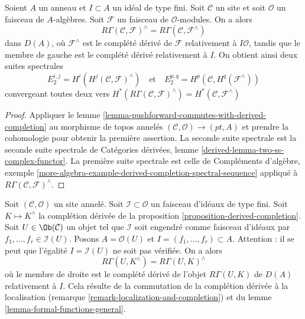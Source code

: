 \begin{lemma}
\label{lemma-formal-functions-general}
Soient $A$ un anneau et $I \subset A$ un idéal de type fini.
Soit $\mathcal{C}$ un site et soit $\mathcal{O}$ un faisceau
de $A$-algèbres. Soit $\mathcal{F}$ un faisceau de $\mathcal{O}$-modules.
On a alors
$$
R\Gamma(\mathcal{C}, \mathcal{F})^\wedge =
R\Gamma(\mathcal{C}, \mathcal{F}^\wedge)
$$
dans $D(A)$, où $\mathcal{F}^\wedge$ est le complété
dérivé de $\mathcal{F}$ relativement à $I\mathcal{O}$, tandis que le membre de
gauche est le complété dérivé relativement à $I$.
On obtient ainsi deux suites spectrales
$$
E_2^{i, j} = H^i(H^j(\mathcal{C}, \mathcal{F})^\wedge)
\quad\text{et}\quad
E_2^{p, q} = H^p(\mathcal{C}, H^q(\mathcal{F}^\wedge))
$$
convergeant toutes deux vers
$H^*(R\Gamma(\mathcal{C}, \mathcal{F})^\wedge) =
H^*(\mathcal{C}, \mathcal{F}^\wedge)$
\end{lemma}

\begin{proof}
Appliquer le lemme \ref{lemma-pushforward-commutes-with-derived-completion}
au morphisme de topos annelés $(\mathcal{C}, \mathcal{O}) \to (pt, A)$
et prendre la cohomologie pour obtenir la première assertion. La seconde suite spectrale
est la seconde suite spectrale de
Catégories dérivées, lemme \ref{derived-lemma-two-ss-complex-functor}.
La première suite spectrale est celle de
Compléments d'algèbre, exemple
\ref{more-algebra-example-derived-completion-spectral-sequence}
appliqué à $R\Gamma(\mathcal{C}, \mathcal{F})^\wedge$.
\end{proof}

\begin{remark}
\label{remark-local-calculation-derived-completion}
Soit $(\mathcal{C}, \mathcal{O})$ un site annelé.
Soit $\mathcal{I} \subset \mathcal{O}$ un faisceau d'idéaux
de type fini. Soit $K \mapsto K^\wedge$ la complétion dérivée de la
proposition \ref{proposition-derived-completion}.
Soit $U \in \Ob(\mathcal{C})$ un objet tel que $\mathcal{I}$
soit engendré comme faisceau d'idéaux par $f_1, \ldots, f_r \in \mathcal{I}(U)$.
Posons $A = \mathcal{O}(U)$ et $I = (f_1, \ldots, f_r) \subset A$.
Attention : il se peut que l'égalité $I = \mathcal{I}(U)$ ne soit pas vérifiée.
On a alors
$$
R\Gamma(U, K^\wedge) = R\Gamma(U, K)^\wedge
$$
où le membre de droite est le complété dérivé de
l'objet $R\Gamma(U, K)$ de $D(A)$ relativement à $I$.
Cela résulte de la commutation de la complétion dérivée à la localisation
(remarque \ref{remark-localization-and-completion}) et du
lemme \ref{lemma-formal-functions-general}.
\end{remark}








